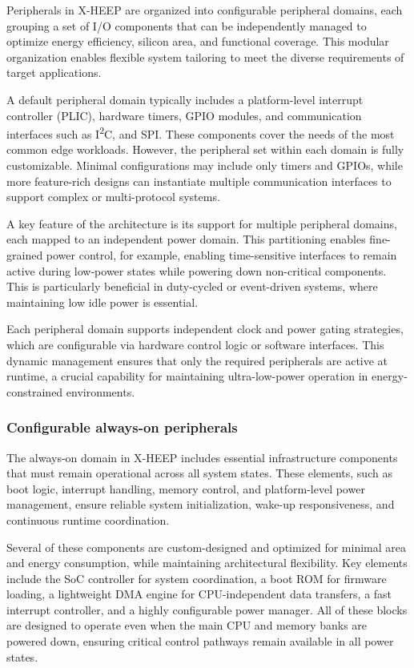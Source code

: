                 Peripherals in \mbox{X-HEEP} are organized into configurable peripheral domains, each grouping a set of I/O components that can be independently managed to optimize energy efficiency, silicon area, and functional coverage. This modular organization enables flexible system tailoring to meet the diverse requirements of target applications.
                
                A default peripheral domain typically includes a platform-level interrupt controller (PLIC), hardware timers, GPIO modules, and communication interfaces such as I\textsuperscript{2}C, and SPI. These components cover the needs of the most common edge workloads. However, the peripheral set within each domain is fully customizable. Minimal configurations may include only timers and GPIOs, while more feature-rich designs can instantiate multiple communication interfaces to support complex or multi-protocol systems.
                
                A key feature of the architecture is its support for multiple peripheral domains, each mapped to an independent power domain. This partitioning enables fine-grained power control, for example, enabling time-sensitive interfaces to remain active during low-power states while powering down non-critical components. This is particularly beneficial in duty-cycled or event-driven systems, where maintaining low idle power is essential.
                
                Each peripheral domain supports independent clock and power gating strategies, which are configurable via hardware control logic or software interfaces. This dynamic management ensures that only the required peripherals are active at runtime, a crucial capability for maintaining ultra-low-power operation in energy-constrained environments.

            \subsubsection*{Configurable always-on peripherals}

                The always-on domain in \mbox{X-HEEP} includes essential infrastructure components that must remain operational across all system states. These elements, such as boot logic, interrupt handling, memory control, and platform-level power management, ensure reliable system initialization, wake-up responsiveness, and continuous runtime coordination.
                
                Several of these components are custom-designed and optimized for minimal area and energy consumption, while maintaining architectural flexibility. Key elements include the SoC controller for system coordination, a boot ROM for firmware loading, a lightweight DMA engine for CPU-independent data transfers, a fast interrupt controller, and a highly configurable power manager. All of these blocks are designed to operate even when the main CPU and memory banks are powered down, ensuring critical control pathways remain available in all power states.
                
